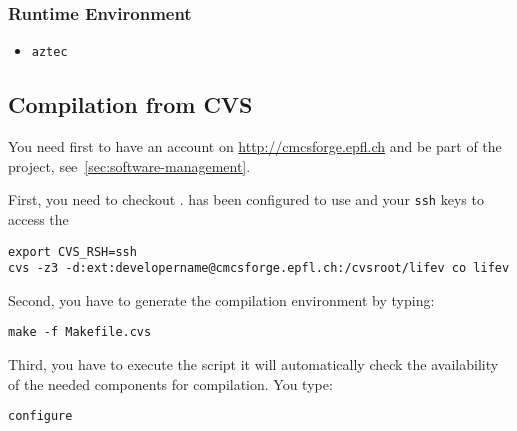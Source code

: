 
\subsubsection{Runtime Environment}
\label{sec:runtime-env} 

\begin{itemize}
\item \verb!aztec!
\end{itemize} 

\subsection{Compilation from CVS}
\label{sec:compile-cvs} 
You need first to have an account on \url{http://cmcsforge.epfl.ch} and
be part of the \lifev project, see~\ref{sec:software-management}. 

\noindent First, you need to checkout \lifev.  has
been configured to use  and your \verb!ssh! keys to
access the 

\begin{verbatim}
export CVS_RSH=ssh
cvs -z3 -d:ext:developername@cmcsforge.epfl.ch:/cvsroot/lifev co lifev
\end{verbatim}

\noindent Second, you have to generate the compilation environment by typing:
\begin{verbatim}
make -f Makefile.cvs
\end{verbatim}

\noindent Third, you have to execute the script
it will automatically check the availability of the needed components
for \lifev compilation. You type: 

\begin{verbatim}
configure
\end{verbatim}

